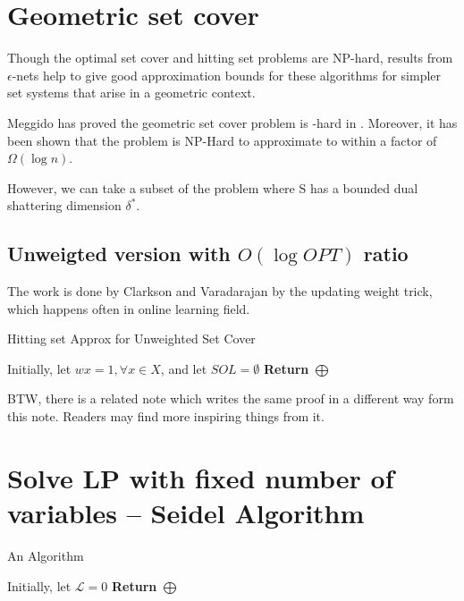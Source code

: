 \documentclass[11pt]{article}
\begin{document}
\section{Geometric set cover}

Though the optimal set cover and hitting set
problems are NP-hard, results from $\epsilon$-nets help to give good approximation bounds for these algorithms for
simpler set systems that arise in a geometric context. 

Meggido has proved the geometric set cover problem is \NP-hard in \cite{megiddo1984complexity}. 
Moreover, it has been shown that the problem is NP-Hard to approximate to within a factor of $\Omega(\log n)$.

However, we can take a subset of the problem where S has a bounded dual shattering dimension $\delta^*$.


\subsection{Unweigted version with $O(\log OPT)$ ratio}
The work is done by Clarkson and Varadarajan \cite{clarkson2007improved} by the updating weight trick, 
	which happens often in online learning field. 
	
\begin{algorithm}[h]
	\caption{Hitting set Approx for Unweighted Set Cover}
	\label{alg-set-cover-unweighted}
	Initially, let $w{x} = 1,\forall x\in X$, and let $SOL=\emptyset$\;
	{\bf Return} $\bigoplus$\;

\end{algorithm}
\cite{har2012weighted}




BTW, there is a related note \cite{GeometricSetCover} which writes the same proof in a different way form this note. 
Readers may find more inspiring things from it.  


\section{Solve LP with fixed number of variables -- Seidel Algorithm}




\begin{algorithm}[h]
\caption{An Algorithm}
\label{algo2}
Initially, let $\mathcal{L} = 0$\;
{\bf Return} $\bigoplus$\;
\cite{har2012weighted}
\end{algorithm}
\cite{Seidel}


\end{document}
